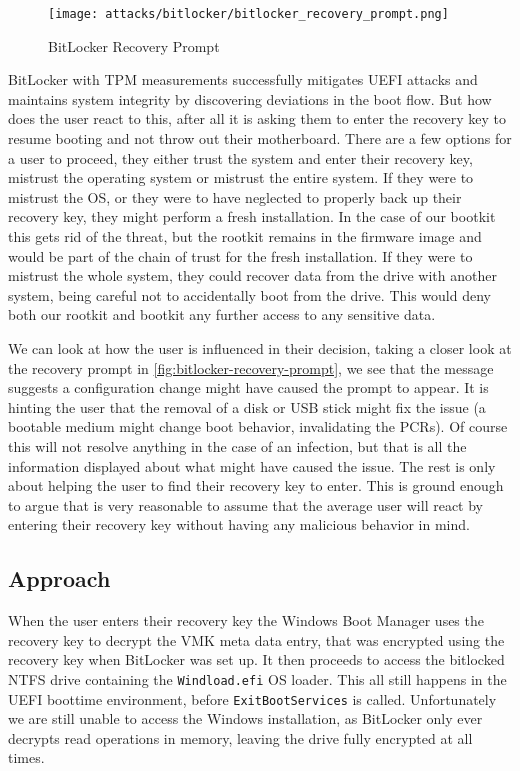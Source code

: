 \begin{figure}[htb]
    \centering
    \texttt{[image: attacks/bitlocker/bitlocker\_recovery\_prompt.png]}
    \caption{BitLocker Recovery Prompt}
    \label{fig:bitlocker-recovery-prompt}
\end{figure}

BitLocker with \ac{TPM} measurements successfully mitigates \ac{UEFI} attacks and maintains system integrity by discovering deviations in the boot flow.
But how does the user react to this, after all it is asking them to enter the recovery key to resume booting and not throw out their motherboard.
There are a few options for a user to proceed, they either trust the system and enter their recovery key, mistrust the operating system or mistrust the entire system.
If they were to mistrust the \ac{OS}, or they were to have neglected to properly back up their recovery key, they might perform a fresh installation.
In the case of our bootkit this gets rid of the threat, but the rootkit remains in the firmware image and would be part of the chain of trust for the fresh installation.
If they were to mistrust the whole system, they could recover data from the drive with another system, being careful not to accidentally boot from the drive.
This would deny both our rootkit and bootkit any further access to any sensitive data.

We can look at how the user is influenced in their decision, taking a closer look at the recovery prompt in \autoref{fig:bitlocker-recovery-prompt}, we see that the message suggests a configuration change might have caused the prompt to appear. It is hinting the user that the removal of a disk or \ac{USB} stick might fix the issue (a bootable medium might change boot behavior, invalidating the \acp{PCR}). Of course this will not resolve anything in the case of an infection, but that is all the information displayed about what might have caused the issue. The rest is only about helping the user to find their recovery key to enter.
This is ground enough to argue that is very reasonable to assume that the average user will react by entering their recovery key without having any malicious behavior in mind.


\subsection{Approach}

When the user enters their recovery key the Windows Boot Manager uses the recovery key to decrypt the \ac{VMK} meta data entry, that was encrypted using the recovery key when BitLocker was set up.
It then proceeds to access the bitlocked \ac{NTFS} drive containing the \lstinline{Windload.efi} \ac{OS} loader.
This all still happens in the \ac{UEFI} boottime environment, before \lstinline{ExitBootServices} is called.
Unfortunately we are still unable to access the Windows installation, as BitLocker only ever decrypts read operations in memory, leaving the drive fully encrypted at all times.

